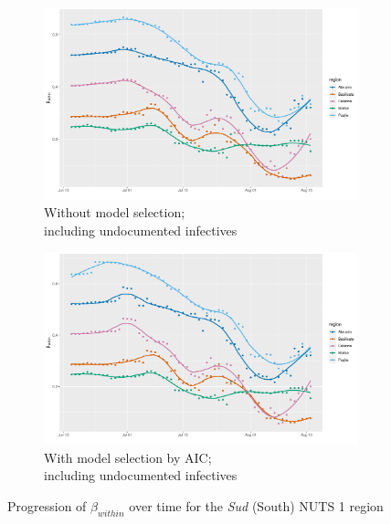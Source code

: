 \documentclass[12pt]{article}
\begin{document}
\begin{appendices}
\begin{figure}[H]
\begin{subfigure}{\textwidth}
    	      \includegraphics[width=0.95\linewidth]{output/model_within_lag14_betawithin_Sud_UndocQuadratic_rolling.pdf}
    	      \caption{Without model selection; \\ including undocumented infectives}
    	      \label{fig:beta_within_over_time_sud_regular_undoc}
    	    \end{subfigure}\newline
    	    \begin{subfigure}{\textwidth}
    	      \centering
    	      \includegraphics[width=0.95\linewidth]{output/model_within_lag14_betawithin_Sud_aic_UndocQuadratic_rolling.pdf}
    	      \caption{With model selection by AIC; \\ including undocumented infectives}
    	      \label{fig:beta_within_over_time_sud_aic_undoc}
    	    \end{subfigure}
    	    \caption{Progression of $\beta_{within}$ over time for the \textit{Sud} (South) NUTS 1 region}
    	    \label{fig:beta_within_over_time_sud}
	    \end{figure}
		

\end{appendices}
\end{document}
